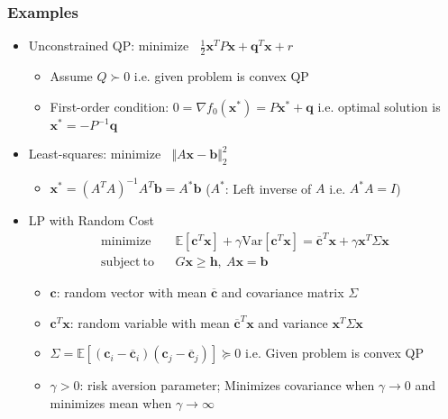 \subsubsection*{Examples}
\begin{itemize}
    \item Unconstrained QP: $\mathrm{minimize}~~~~\frac 1 2 \mathbf{x}^TP\mathbf{x} + \mathbf{q}^T\mathbf{x} + r$
    \begin{itemize}
        \item Assume $Q \succ 0$ i.e. given problem is convex QP
        \item First-order condition: $0 = \nabla f_0(\mathbf{x}^{\ast}) = P\mathbf{x}^{\ast} + \mathbf{q}$
            i.e. optimal solution is $\mathbf{x}^{\ast} = -P^{-1}\mathbf{q}$
    \end{itemize}
    \item Least-squares: $\mathrm{minimize}~~~~\Vert A\mathbf{x} - \mathbf{b} \Vert_2^2$
    \begin{itemize}
        \item $\mathbf{x}^{\ast} = \left(A^TA\right)^{-1}A^T\mathbf{b} = A^{\ast}\mathbf{b}$ ($A^{\ast}$: Left inverse of $A$ i.e. $A^{\ast}A = I$)
    \end{itemize}
    \item LP with Random Cost
    $$ \begin{aligned}
        \mathrm{minimize}~~&~~
            \mathbb{E}\left[ \mathbf{c}^T\mathbf{x} \right] + \gamma \mathrm{Var}\left[ \mathbf{c}^T \mathbf{x} \right]
            = \overline{\mathbf{c}}^T\mathbf{x} + \gamma \mathbf{x}^T \Sigma \mathbf{x} \\
        \mathrm{subject~to}~~&~~G\mathbf{x} \geq \mathbf{h},~A\mathbf{x} = \mathbf{b}
    \end{aligned} $$
    \begin{itemize}
        \item $\mathbf{c}$: random vector with mean $\overline{\mathbf{c}}$ and covariance matrix $\Sigma$
        \item $\mathbf{c}^T\mathbf{x}$: random variable with mean $\overline{\mathbf{c}}^T\mathbf{x}$ and variance $\mathbf{x}^T\Sigma\mathbf{x}$
        \item $\Sigma = \mathbb{E}\left[\left(\mathbf{c}_i - \overline{\mathbf{c}}_i\right)\left(\mathbf{c}_j - \overline{\mathbf{c}}_j\right)\right] \succeq 0$
            i.e. Given problem is convex QP
        \item $\gamma > 0$: risk aversion parameter; Minimizes covariance when $\gamma \rightarrow 0$ and minimizes mean when $\gamma \rightarrow \infty$
    \end{itemize}
\end{itemize}

